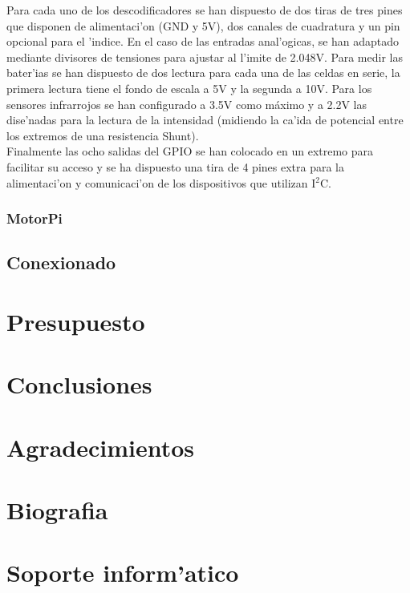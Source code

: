 \documentclass[twoside,12pt]{article}
\begin{document}
Para cada uno de los descodificadores se han dispuesto de dos tiras de tres pines que disponen de alimentaci'on (GND y 5V), dos canales de cuadratura y un pin opcional para el 'indice. En el caso de las entradas anal'ogicas, se han adaptado mediante divisores de tensiones para ajustar al l'imite de 2.048V. Para medir las bater'ias se han dispuesto de dos lectura para cada una de las celdas en serie, la primera lectura tiene el fondo de escala a 5V y la segunda a 10V. Para los sensores infrarrojos se han configurado a 3.5V como máximo y a 2.2V las dise'nadas para la lectura de la intensidad (midiendo la ca'ida de potencial entre los extremos de una resistencia Shunt). \\

Finalmente las ocho salidas del GPIO se han colocado en un extremo para facilitar su acceso y se ha dispuesto una tira de 4 pines extra para la alimentaci'on y comunicaci'on de los dispositivos que utilizan I${^2}$C.   


\subsubsection{MotorPi}

\subsection{Conexionado}

\newpage


\section{Presupuesto}
\newpage

\section{Conclusiones}
\newpage

\section{Agradecimientos}
\newpage

\section{Biografia}
\newpage

\section{Soporte inform'atico}
\end{document}
